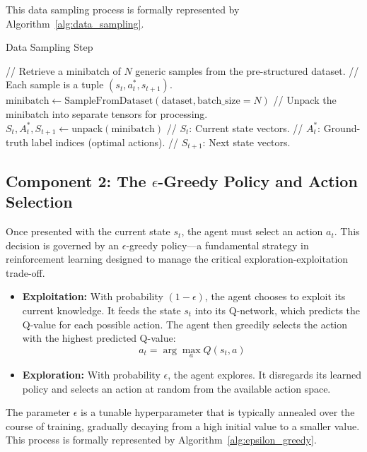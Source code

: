 \documentclass[12pt]{report}
\begin{document}
This data sampling process is formally represented by Algorithm~\ref{alg:data_sampling}.

\begin{algorithm}[H]
\caption{Data Sampling Step}
\label{alg:data_sampling}
\begin{algorithmic}[1]
\State // Retrieve a minibatch of \( N \) generic samples from the pre-structured dataset.
\State // Each sample is a tuple \( (s_t, a^*_t, s_{t+1}) \).
\State \( \text{minibatch} \gets \text{SampleFromDataset}(\text{dataset}, \text{batch\_size} = N) \)
\State // Unpack the minibatch into separate tensors for processing.
\State \( S_t, A^*_t, S_{t+1} \gets \text{unpack}(\text{minibatch}) \)
\State // \( S_t \): Current state vectors.
\State // \( A^*_t \): Ground-truth label indices (optimal actions).
\State // \( S_{t+1} \): Next state vectors.
\end{algorithmic}
\end{algorithm}

\subsection{Component 2: The $\epsilon$-Greedy Policy and Action Selection}

Once presented with the current state $s_t$, the agent must select an action $a_t$. This decision is governed by an $\epsilon$-greedy policy—a fundamental strategy in reinforcement learning designed to manage the critical exploration-exploitation trade-off.

\begin{itemize}
    \item \textbf{Exploitation:} With probability $(1 - \epsilon)$, the agent chooses to exploit its current knowledge. It feeds the state $s_t$ into its Q-network, which predicts the Q-value for each possible action. The agent then greedily selects the action with the highest predicted Q-value: 
    \[
    a_t = \arg\max_a Q(s_t, a)
    \]
    
    \item \textbf{Exploration:} With probability $\epsilon$, the agent explores. It disregards its learned policy and selects an action at random from the available action space.
\end{itemize}

The parameter $\epsilon$ is a tunable hyperparameter that is typically annealed over the course of training, gradually decaying from a high initial value to a smaller value. This process is formally represented by Algorithm~\ref{alg:epsilon_greedy}.
\end{document}
